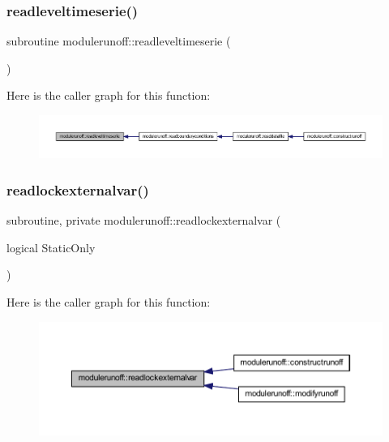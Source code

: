 \subsubsection{\texorpdfstring{readleveltimeserie()}{readleveltimeserie()}}
{\footnotesize\ttfamily subroutine modulerunoff\+::readleveltimeserie (\begin{DoxyParamCaption}{ }\end{DoxyParamCaption})\hspace{0.3cm}{\ttfamily [private]}}

Here is the caller graph for this function\+:\nopagebreak
\begin{figure}[H]
\begin{center}
\leavevmode
\includegraphics[width=350pt]{namespacemodulerunoff_a16bc6313240379de466a61574c8dbc1d_icgraph}
\end{center}
\end{figure}
\mbox{\label{namespacemodulerunoff_ae46242484733cacdd1c5d484f4e6eba7}} 
\subsubsection{\texorpdfstring{readlockexternalvar()}{readlockexternalvar()}}
{\footnotesize\ttfamily subroutine, private modulerunoff\+::readlockexternalvar (\begin{DoxyParamCaption}\item[{logical}]{Static\+Only }\end{DoxyParamCaption})\hspace{0.3cm}{\ttfamily [private]}}

Here is the caller graph for this function\+:\nopagebreak
\begin{figure}[H]
\begin{center}
\leavevmode
\includegraphics[width=350pt]{namespacemodulerunoff_ae46242484733cacdd1c5d484f4e6eba7_icgraph}
\end{center}
\end{figure}
\mbox{\label{namespacemodulerunoff_a900316fc0130b378405b9b03d84eb9cd}} 
